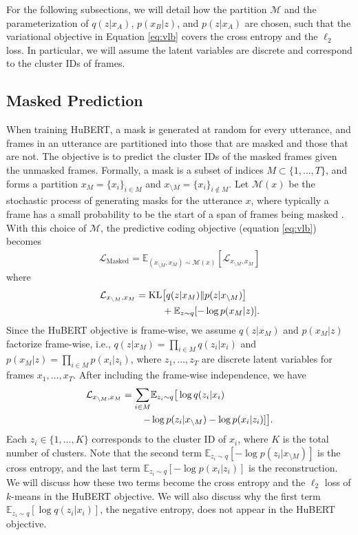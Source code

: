 For the following subsections, we will detail how
the partition $\mathcal{M}$ and the parameterization of $q(z|x_A)$,
$p(x_B | z)$, and $p(z|x_A)$ are chosen, such that
the variational objective in Equation \ref{eq:vlb}
covers the cross entropy and the $\ell_2$ loss.
In particular, we will assume the latent variables are discrete
and correspond to the cluster IDs of frames.
%
%

\subsection{Masked Prediction}
\label{methods:mlm}

When training HuBERT, a mask is generated at random for every utterance, and frames in an utterance are partitioned into those that are masked and those that are not.
The objective is to predict the cluster IDs of the masked frames given the unmasked frames.
Formally, a mask is a subset of indices $M \subset \{1,\dots,T\}$,
and forms a partition $x_M = \{x_i\}_{i \in M}$ and $x_{\setminus M} = \{x_i\}_{i \not\in M}$.
Let $\mathcal{M}(x)$ be the stochastic process of generating masks for the utterance $x$, where typically a frame has a small probability to be the start of a span of frames being masked \citep{baevski2020wav2vec}.
With this choice of $\mathcal{M}$, the predictive coding objective (equation \ref{eq:vlb}) becomes
\begin{align}
\mathcal{L}_{\text{Masked}} = \mathbb{E}_{(x_{\setminus M}, x_M) \sim \mathcal{M}(x)} [\mathcal{L}_{x_{\setminus M}, x_M}]
\end{align}
where
\begin{align}
\mathcal{L}_{x_{\setminus M}, x_M} = \mathrm{KL} & \big[q(z|x_M)\|p(z|x_{\setminus M})\big] \notag \\
  & + \mathbb{E}_{z \sim q}[-\log p(x_M | z)].
\end{align}
Since the HuBERT objective is frame-wise, we assume $q(z|x_M)$ and
$p(x_M | z)$ factorize frame-wise, i.e., $q(z|x_M) = \prod_{i \in M} q(z_i | x_i)$
and $p(x_M | z) = \prod_{i \in M} p(x_i | z_i)$,
where $z_1, \dots, z_T$ are discrete latent variables for frames $x_1, \dots, x_T$.
After including the frame-wise independence, we have
\begin{align}
\mathcal{L}_{x_{\setminus M}, x_M}
  = \sum_{i \in M} & \mathbb{E}_{z_i \sim q} \big[\log q(z_i|x_i) \label{eq:vlb-mlm} \\
   - &\log p(z_i|x_{\setminus M}) - \log p(x_i | z_i)] \big]. \notag
\end{align}
Each $z_i \in \{1, \dots, K\}$ corresponds to the cluster ID of $x_i$, where $K$ is the total number of clusters.
Note that the second term
$\mathbb{E}_{z_i \sim q}[-\log p(z_i | x_{\setminus M})]$
is the cross entropy, and the last term
$\mathbb{E}_{z_i \sim q}[-\log p(x_i | z_i)]$
is the reconstruction.
We will discuss how these two terms become the cross entropy
and the $\ell_2$ loss of $k$-means in the HuBERT objective.
We will also discuss why
the first term $\mathbb{E}_{z_i \sim q}[\log q(z_i | x_i)]$,
the negative entropy, does not appear in the HuBERT objective.

